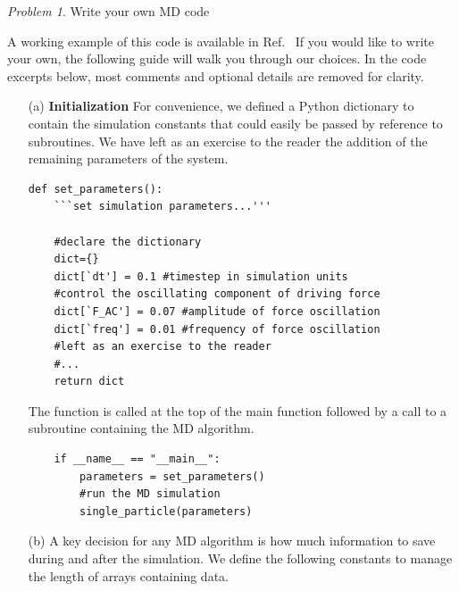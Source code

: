 \documentclass[preprint,showpacs,preprintnumbers,amsmath,amssymb,aps,prb]{revtex4-1}
\theoremstyle{remark}
\newtheorem{problem}{Problem}
\begin{document}
\begin{problem}{Write your own MD code}
  \label{ex:euler}

  A working example of this code is available
  in Ref.~\cite{supplemental}
  If you would like to write your own,
  the following guide
  will walk you through our choices.
  In the code excerpts below,
  most comments and optional details are removed for clarity.
  
  \begin{enumerate}
    
  \item[(a)] {\bf Initialization}
    For convenience,
    we defined a Python dictionary
    to contain the simulation constants
    that could easily be passed by reference
    to subroutines.
    We have left as an exercise to the reader the addition
    of the remaining parameters of the system.
    \begin{verbatim}
def set_parameters():           
    ```set simulation parameters...'''

    #declare the dictionary     
    dict={}  
    dict[`dt'] = 0.1 #timestep in simulation units
    #control the oscillating component of driving force
    dict[`F_AC'] = 0.07 #amplitude of force oscillation
    dict[`freq'] = 0.01 #frequency of force oscillation
    #left as an exercise to the reader
    #...
    return dict

    \end{verbatim}

    The function is called at the top of the main function
    followed by a call to a subroutine
    containing the MD algorithm.

     \begin{verbatim}
    if __name__ == "__main__":
        parameters = set_parameters()
        #run the MD simulation
        single_particle(parameters)

\end{verbatim}

    
  \item[(b)]
    A key decision for any MD algorithm
    is how much information to save during and after
    the simulation.
    We define the following constants
    to manage the length of arrays
    containing data.
    

\end{enumerate}
\end{problem}
\end{document}
